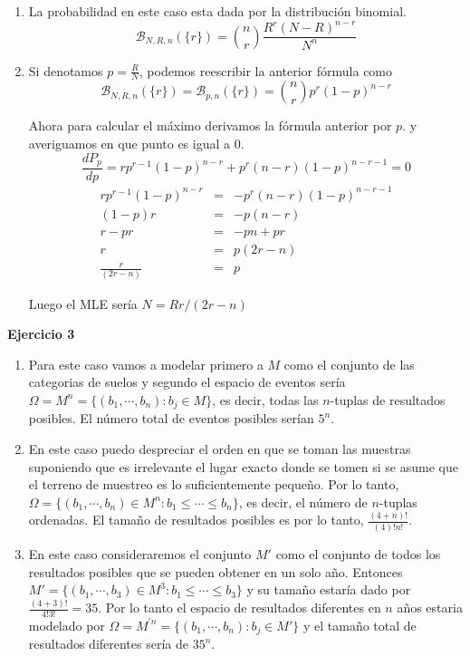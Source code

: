 \documentclass[letter,twoside,12pt]{article}
\begin{document}
\begin{enumerate}[label=\textbf{\arabic*)}]
\item La probabilidad en este caso esta dada por la distribución binomial.
\begin{equation}
\mathcal{B}_{N,R,n}(\{r\})=\binom{n}{r}\frac{R^r(N-R)^{n-r}}{N^n} \nonumber
\end{equation}
\item Si denotamos $ p = \frac{R}{N}$, podemos reescribir la anterior fórmula como
\begin{equation}
\mathcal{B}_{N,R,n}(\{r\}) =\mathcal{B}_{p,n}(\{r\})=\binom{n}{r}p^r(1-p)^{n-r} \nonumber
\end{equation}

Ahora para calcular el máximo derivamos la fórmula anterior por $ p $. y averiguamos en que punto es igual a 0.
\begin{equation}
\frac{dP_p}{dp}=rp^{r-1}(1-p)^{n-r}+p^r(n-r)(1-p)^{n-r-1}=0 \nonumber
\end{equation}
\begin{eqnarray}
rp^{r-1}(1-p)^{n-r}&=&-p^r(n-r)(1-p)^{n-r-1} \nonumber
\\ (1-p)r&=&-p(n-r) \nonumber
\\ r-pr&=&-pn+pr \nonumber
\\ r&=&p(2r-n) \nonumber
\\ \frac{r}{(2r-n)}&=&p \nonumber
\end{eqnarray}

Luego el MLE sería $ N=Rr/(2r-n) $
\end{enumerate}
\textbf{Ejercicio 3}
\begin{enumerate}[label=\textbf{\arabic*.}]
\item Para este caso vamos a modelar primero a $M$ como el conjunto de las categorias de suelos y segundo el espacio de eventos sería $ \Omega = M^n=\{(b_1,\cdots,b_n):b_j \in M\} $, es decir, todas las $n$-tuplas de resultados posibles. El número total de eventos posibles serían $5^n$.

\item En este caso puedo despreciar el orden en que se toman las muestras suponiendo que es irrelevante el lugar exacto donde se tomen si se asume que el terreno de muestreo es lo suficientemente pequeño. Por lo tanto, $ \Omega = \{(b_1,\cdots,b_n)\in M^n:b_1\leq \cdots \leq b_n\} $, es decir, el número de $n$-tuplas ordenadas. El tamaño de resultados posibles es por lo tanto, $ \frac{(4+n)!}{(4)!n!} $.

\item En este caso consideraremos el conjunto $M'$ como el conjunto de todos los resultados posibles que se pueden obtener en un solo año. Entonces $M' = \{(b_1,\cdots,b_3)\in M^3:b_1\leq \cdots \leq b_3\}$ y su tamaño estaría dado por $ \frac{(4+3)!}{4!3!}= 35 $. Por lo tanto el espacio de resultados diferentes en $n$ años estaria modelado por $ \Omega = M^{'n}=\{(b_1,\cdots,b_n):b_j \in M'\} $ y el tamaño total de resultados diferentes sería de $35^n$.
\end{enumerate}
\end{document}
